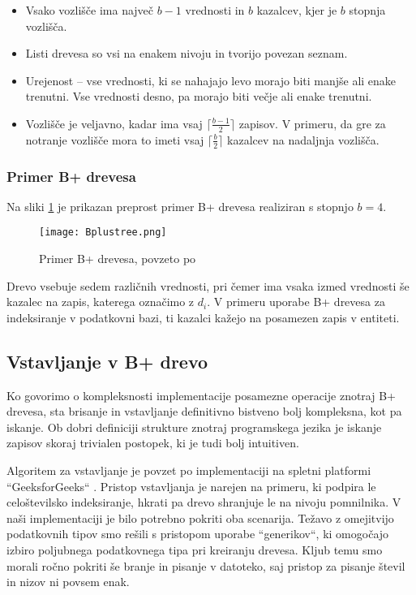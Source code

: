 \documentclass[a4paper,12pt,openright]{book}
\begin{document}
        \begin{itemize}
            \item Vsako vozlišče ima največ $b - 1$ vrednosti in $b$ kazalcev, kjer je $b$ stopnja vozlišča.
            \item Listi drevesa so vsi na enakem nivoju in tvorijo povezan seznam.
            \item Urejenost – vse vrednosti, ki se nahajajo levo morajo biti manjše ali enake trenutni. Vse vrednosti desno, pa morajo biti večje ali enake trenutni.
            \item Vozlišče je veljavno, kadar ima vsaj $\lceil \frac{b - 1}{2}\rceil$ zapisov. V primeru, da gre za notranje vozlišče mora to imeti vsaj $\lceil \frac{b}{2} \rceil$ kazalcev na nadaljnja vozlišča.
        \end{itemize}
        
        \subsubsection{Primer B+ drevesa}
        Na sliki \ref{btree_example} je prikazan preprost primer B+ drevesa realiziran s stopnjo $b=4$.
        
        \begin{figure}[H]        
            \centerline{\texttt{[image: Bplustree.png]}}
            \caption{Primer B+ drevesa, povzeto po \cite{BPTREE}}
            \label{btree_example}
        \end{figure}

        \noindent
        Drevo vsebuje sedem različnih vrednosti, pri čemer ima vsaka izmed vrednosti še kazalec na zapis, katerega označimo z $d_i$. V primeru uporabe B+ drevesa za indeksiranje v podatkovni bazi, ti kazalci kažejo na posamezen zapis v entiteti.

        \subsection{Vstavljanje v B+ drevo}

        Ko govorimo o kompleksnosti implementacije posamezne operacije znotraj B+ drevesa, sta brisanje in vstavljanje definitivno bistveno bolj kompleksna, kot pa iskanje. Ob dobri definiciji strukture znotraj programskega jezika je iskanje zapisov skoraj trivialen postopek, ki je tudi bolj intuitiven.

        Algoritem za vstavljanje je povzet po implementaciji na spletni platformi ``GeeksforGeeks`` \cite{G4G_BINSERT}. Pristop vstavljanja je narejen na primeru, ki podpira le celoštevilsko indeksiranje, hkrati pa drevo shranjuje le na nivoju pomnilnika. V naši implementaciji je bilo potrebno pokriti oba scenarija. Težavo z omejitvijo podatkovnih tipov smo rešili s pristopom uporabe ``generikov``, ki omogočajo izbiro poljubnega podatkovnega tipa pri kreiranju drevesa. Kljub temu smo morali ročno pokriti še branje in pisanje v datoteko, saj pristop za pisanje števil in nizov ni povsem enak.
\end{document}
